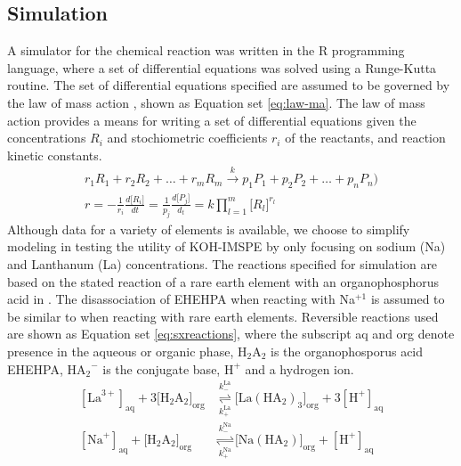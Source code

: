 \documentclass[
]{article}
\begin{document}
\hypertarget{simulation}{%
\subsection{Simulation}\label{simulation}}

A simulator for the chemical reaction was written in the \textsf{R} programming language, where a set of differential equations was solved using a Runge-Kutta routine. The set of differential equations specified are assumed to be governed by the law of mass action \citep{espenson1995chemical}, shown as Equation set \eqref{eq:law-ma}. The law of mass action provides a means for writing a set of differential equations given the concentrations \(R_i\) and stochiometric coefficients \(r_i\) of the reactants, and reaction kinetic constants. \begin{equation}
\begin{split}
r_1R_1 + r_2R_2 + \dots + r_mR_m \overset{k}{\rightarrow} p_1P_1 + p_2P_2 + \dots + p_nP_n )\\
r = -\frac{1}{r_i}\frac{d\lbrack R_i \rbrack}{dt} = \frac{1}{p_j}\frac{d\lbrack P_j\rbrack}{d_t} = k \prod_{l = 1}^m \lbrack R_l \rbrack^{r_l}
\end{split}
\label{eq:law-ma}
\end{equation}
Although data for a variety of elements is available, we choose to simplify modeling in testing the utility of KOH-IMSPE by only focusing on sodium (Na) and Lanthanum (La) concentrations. The reactions specified for simulation are based on the stated reaction of a rare earth element with an organophosphorus acid in \citet{gupta1992extractive}. The disassociation of EHEHPA when reacting with Na\(^{+1}\) is assumed to be similar to when reacting with rare earth elements. Reversible reactions used are shown as Equation set \eqref{eq:sxreactions}, where the subscript aq and org denote presence in the aqueous or organic phase, \(\mathrm{H_2A_2}\) is the organophosporus acid EHEHPA, \(\mathrm{HA_2}^-\) is the conjugate base, \(\mathrm{H}^+\) and a hydrogen ion.\begin{equation}
\begin{split}
[\mathrm{La}^{3+}]_{\mathrm{aq}} + 3\lbrack \mathrm{H}_2\mathrm{A}_2\rbrack_{\mathrm{org}} &\overset{k^\mathrm{La}_{-}}{\underset{k^\mathrm{La}_{+}}{\rightleftharpoons}} \lbrack \mathrm{La}(\mathrm{HA}_2)_3\rbrack_{\mathrm{org}} + 3[\mathrm{H}^+]_\mathrm{aq}\\
[\mathrm{Na}^+]_\mathrm{aq} + \lbrack \mathrm{H}_2\mathrm{A}_2\rbrack_{\mathrm{org}} &\overset{k^\mathrm{Na}_{-}}{\underset{k^\mathrm{Na}_{+}}{\rightleftharpoons}} \lbrack \mathrm{Na}(\mathrm{HA}_2)\rbrack_{\mathrm{org}} + [\mathrm{H}^+]_\mathrm{aq}\\
\end{split}
\label{eq:sxreactions}
\end{equation}
\end{document}
